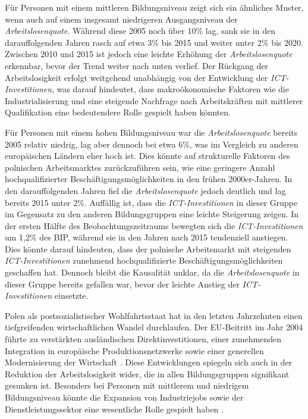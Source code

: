 Für Personen mit einem mittleren Bildungsniveau zeigt sich ein ähnliches Muster, wenn 
auch auf einem insgesamt niedrigeren Ausgangsniveau der \textit{Arbeitslosenquote}. 
Während diese 2005 noch über 10\% lag, sank sie in den darauffolgenden Jahren rasch auf 
etwa 3\% bis 2015 und weiter unter 2\% bis 2020. Zwischen 2010 und 2015 ist jedoch eine 
leichte Erhöhung der \textit{Arbeitslosenquote} erkennbar, bevor der Trend weiter nach 
unten verlief. Der Rückgang der Arbeitslosigkeit erfolgt weitgehend unabhängig von der 
Entwicklung der \textit{\ac{ICT}-Investitionen}, was darauf hindeutet, dass 
makroökonomische Faktoren wie die Industrialisierung und eine steigende Nachfrage 
nach Arbeitskräften mit mittlerer Qualifikation eine bedeutendere Rolle gespielt 
haben könnten.

Für Personen mit einem hohen Bildungsniveau war die \textit{Arbeitslosenquote} bereits 
2005 relativ niedrig, lag aber dennoch bei etwa 6\%, was im Vergleich zu anderen 
europäischen Ländern eher hoch ist. Dies könnte auf strukturelle Faktoren des 
polnischen Arbeitsmarktes zurückzuführen sein, wie eine geringere Anzahl 
hochqualifizierter Beschäftigungsmöglichkeiten in den frühen 2000er-Jahren. In den 
darauffolgenden Jahren fiel die \textit{Arbeitslosenquote} jedoch deutlich und lag 
bereits 2015 unter 2\%. Auffällig ist, dass die \textit{\ac{ICT}-Investitionen} in dieser 
Gruppe im Gegensatz zu den anderen Bildungsgruppen eine leichte Steigerung zeigen. 
In der ersten Hälfte des Beobachtungszeitraums bewegten sich die 
\textit{\ac{ICT}-Investitionen} um 1,2\% des BIP, während sie in den Jahren nach 
2015 tendenziell anstiegen. Dies könnte darauf hindeuten, dass der polnische 
Arbeitsmarkt mit steigenden \textit{\ac{ICT}-Investitionen} zunehmend hochqualifizierte 
Beschäftigungsmöglichkeiten geschaffen hat. Dennoch bleibt die Kausalität unklar, 
da die \textit{Arbeitslosenquote} in dieser Gruppe bereits gefallen war, bevor der 
leichte Anstieg der \textit{\ac{ICT}-Investitionen} einsetzte.

Polen als postsozialistischer Wohlfahrtsstaat hat in den letzten Jahrzehnten einen 
tiefgreifenden wirtschaftlichen Wandel durchlaufen. Der EU-Beitritt im Jahr 2004 
führte zu verstärkten ausländischen Direktinvestitionen, einer zunehmenden 
Integration in europäische Produktionsnetzwerke sowie einer generellen 
Modernisierung der Wirtschaft \parencite[vgl.][S. 455–457]{myant2013transition}. Diese 
Entwicklungen spiegeln sich auch in der Reduktion der Arbeitslosigkeit wider, die in 
allen Bildungsgruppen signifikant gesunken ist. Besonders bei Personen mit mittlerem 
und niedrigem Bildungsniveau könnte die Expansion von Industriejobs sowie der 
Dienstleistungssektor eine wesentliche Rolle gespielt haben 
\parencite[vgl.][S. 455–459]{myant2013transition}.

